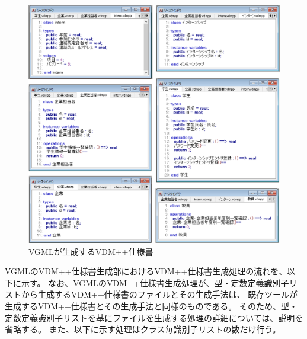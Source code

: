 \begin{figure}[p]
    \begin{center}
        \includegraphics[width=1.0\columnwidth]{image/4_vdm.png}
        \caption{VGMLが生成するVDM++仕様書}
        \label{fig:4_vdm}
    \end{center}
\end{figure}

VGMLのVDM++仕様書生成部におけるVDM++仕様書生成処理の流れを、以下に示す。
なお、VGMLのVDM++仕様書生成処理が、型・定数定義識別子リストから生成するVDM++仕様書のファイルとその生成手法は、
既存ツールが生成するVDM++仕様書とその生成手法と同様のものである。
そのため、型・定数定義識別子リストを基にファイルを生成する処理の詳細については、説明を省略する。
また、以下に示す処理はクラス毎識別子リストの数だけ行う。

